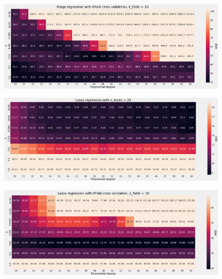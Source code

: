 \begin{figure}[H]
    \centering
    \includegraphics[width=\textwidth]{Figures/g_ridge_hetmap_kfold_n_splits_10.png}
\end{figure}

\begin{figure}[H]
    \centering
    \includegraphics[width=\textwidth]{Figures/g_lasso_heatmap_n_boots_20.png}
\end{figure}

\begin{figure}[H]
    \centering
    \includegraphics[width=\textwidth]{Figures/g_lasso_kfold_n_splits_10.png}
\end{figure}











